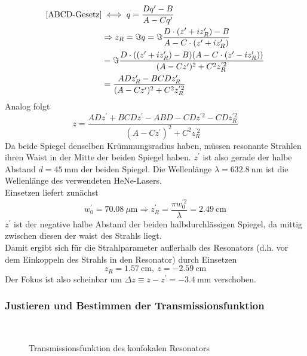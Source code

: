 \documentclass[11pt,a4paper,oneside]{scrartcl}
\begin{document}
\begin{align}
\ref{ABCD-Gesetz}& \iff q = \frac{Dq^\prime-B}{A-Cq^\prime}\\ & \Rightarrow z_R=\Im{q}=\Im{\frac{D\cdot (z^\prime+iz_R^\prime)-B}{A-C\cdot(z^\prime+iz_R^\prime)}}\\ \quad&=\Im{\frac{D\cdot ((z^\prime+iz_R^\prime)-B)(A-C\cdot(z^\prime-iz_R^\prime))}{(A-Cz^\prime)^2+C^2z_R^{^\prime 2}}}\\ \quad&
=\frac{ADz_R^\prime-BCDz_R^\prime}{(A-Cz^\prime)^2+C^2z_R^{^\prime 2}}
\end{align}
Analog folgt 
\begin{equation}
z=\frac{ADz^\prime+BCDz^\prime-ABD-CDz^{\prime 2}-CDz_R^{\prime 2}}{(A-Cz^\prime)^2+C^2z_R^{^\prime 2}}
\end{equation}
Da beide Spiegel denselben Krümmungsradius haben, müssen resonante Strahlen ihren Waist in der Mitte der beiden Spiegel haben. $z^\prime$ ist also gerade der halbe Abstand $d=45\ \mathrm{mm}$ der beiden Spiegel. Die Wellenlänge $\lambda=632.8\ \mathrm{nm}$ ist die Wellenlänge des verwendeten HeNe-Lasers. \\
Einsetzen liefert zunächst
\begin{equation}
w_0^\prime = 70.08\ \mu\mathrm m\Rightarrow z_R^\prime = \frac{\pi w_0^{\prime 2}}{\lambda} = 2.49\ \mathrm{cm}
\end{equation}
 $z^\prime$ ist der negative halbe Abstand der beiden halbdurchlässigen Spiegel, da mittig zwischen diesen der waist des Strahls liegt. \\
Damit ergibt sich für die Strahlparameter außerhalb des Resonators (d.h. vor dem Einkoppeln des Strahls in den Resonator) durch Einsetzen
\begin{equation}
z_R = 1.57\ \mathrm{cm},\ z = -2.59\ \mathrm{cm}
\end{equation}
Der Fokus ist also scheinbar um $\Delta z\equiv z-z^\prime = -3.4\ \mathrm{mm}$ verschoben. 
\subsubsection{Justieren und Bestimmen der Transmissionsfunktion}
\begin{figure}[H]
    \centering
  \\
   \caption{Transmissionsfunktion des konfokalen Resonators}
    \label{FotostreckeTransmissionsfunktion}
\end{figure}
\end{document}
